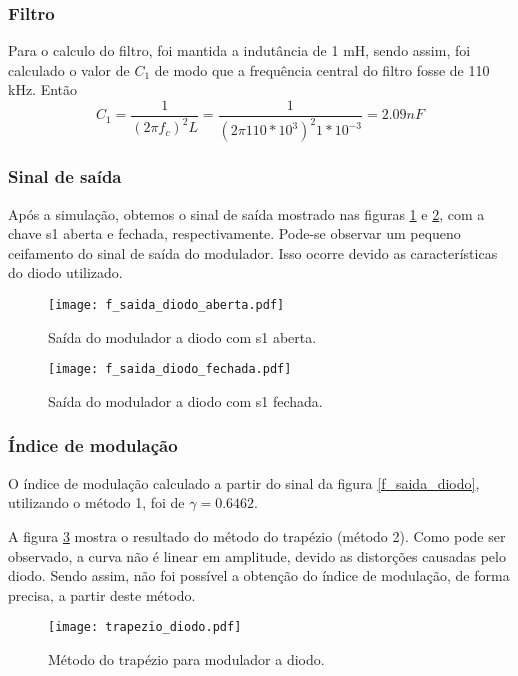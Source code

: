 \subsubsection{Filtro} 

Para o calculo do filtro, foi mantida a indutância de 1 mH, sendo assim, foi calculado o valor de $C_1$ de modo que a frequência central do filtro fosse de 110 kHz.
Então
\[
C_1 = \frac{1}{(2\pi f_c)^2 L } = \frac{1}{(2\pi 110*10^3 )^2 1*10^{-3}} = 2.09nF
\]

\subsubsection{Sinal de saída}

Após a simulação, obtemos o sinal de saída mostrado nas figuras \ref{f_saida_diodo_aberta} e \ref{f_saida_diodo_fechada}, com a chave s1 aberta e fechada, respectivamente. Pode-se observar um pequeno ceifamento do sinal de saída do modulador. Isso ocorre devido as características do diodo utilizado.

\begin{figure}[H]
    \centering
    \caption{Saída do modulador a diodo com s1 aberta.}
    \texttt{[image: f\_saida\_diodo\_aberta.pdf]}
    \label{f_saida_diodo_aberta}
\end{figure}

\begin{figure}[H]
    \centering
    \caption{Saída do modulador a diodo com s1 fechada.}
    \texttt{[image: f\_saida\_diodo\_fechada.pdf]}
    \label{f_saida_diodo_fechada}
\end{figure}

\subsubsection{Índice de modulação}
O índice de modulação calculado a partir do sinal da figura \ref{f_saida_diodo}, utilizando o método 1, foi de $\gamma = 0.6462$.

A figura \ref{f_trapezio_diodo} mostra o resultado do método do trapézio (método 2). Como pode ser observado, a curva não é linear em amplitude, devido as distorções causadas pelo diodo. Sendo assim, não foi possível a obtenção do índice de modulação, de forma precisa, a partir deste método.

\begin{figure}[H]
    \centering
    \caption{Método do trapézio para modulador a diodo.}
    \texttt{[image: trapezio\_diodo.pdf]}
    \label{f_trapezio_diodo}
\end{figure}

